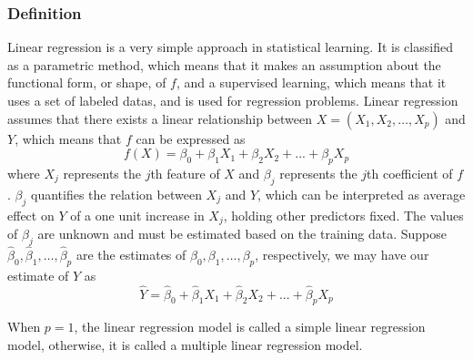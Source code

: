 \documentclass[conf]{new-aiaa}
\begin{document}
\subsubsection{Definition}
Linear regression is a very simple approach in statistical learning. It is classified as a parametric method, which means that it makes an assumption about the functional form, or shape, of $f$, and a supervised learning, which means that it uses a set of labeled datas, and is used for regression problems. Linear regression assumes that there exists a linear relationship between $X = (X_1, X_2, \dots, X_p)$ and $Y$, which means that $f$ can be expressed as
\begin{equation} \label{eq:linmod}
    f(X) = \beta_0 + \beta_1X_1 + \beta_2X_2 + ... + \beta_pX_p
\end{equation}
where $X_j$ represents the $j$th feature of $X$ and $\beta_j$ represents the $j$th coefficient of $f$. $\beta_j$ quantifies the relation between $X_j$ and $Y$, which can be interpreted as average effect on $Y$ of a one unit increase in $X_j$, holding other predictors fixed. The values of $\beta_j$ are unknown and must be estimated based on the training data. Suppose $\hat{\beta}_0, \hat{\beta}_1, \dots, \hat{\beta}_p$ are the estimates of $\beta_0, \beta_1, \dots, \beta_p$, respectively, we may have our estimate of $Y$ as
\begin{equation} \label{eq:linreg}
    \hat{Y} = \hat{\beta}_0 + \hat{\beta}_1X_1 + \hat{\beta}_2X_2 + ... + \hat{\beta}_pX_p
\end{equation}

When $p = 1$, the linear regression model is called a simple linear regression model, otherwise, it is called a multiple linear regression model.
\end{document}
